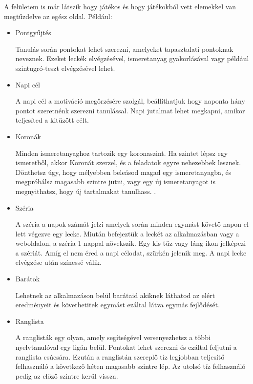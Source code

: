A felületem is már látszik hogy játékos és hogy játékokból vett elemekkel van megtűzdelve az egész oldal. Például:
\begin{itemize}
  \item {Pontgyűjtés}
        \begin{addmargin}[\parindent]{0pt}
          Tanulás során pontokat lehet szerezni, amelyeket tapasztalati pontoknak neveznek. Ezeket leckék elvégzésével, ismeretanyag gyakorlásával vagy például szintugró-teszt elvégzésével lehet.
        \end{addmargin}
  \item Napi cél
        \begin{addmargin}[\parindent]{0pt}
          A napi cél a motiváció megőrzésére szolgál, beállíthatjuk hogy naponta hány pontot szeretnénk szerezni tanulással. Napi jutalmat lehet megkapni, amikor teljesíted a kitűzött célt.
        \end{addmargin}
  \item Koronák
        \begin{addmargin}[\parindent]{0pt}
          Minden ismeretanyaghoz tartozik egy koronaszint. Ha szintet lépsz egy ismeretből, akkor Koronát szerzel, és a feladatok egyre nehezebbek lesznek. Dönthetsz úgy, hogy mélyebben beleásod magad egy ismeretanyagba, és megpróbálsz magasabb szintre jutni, vagy egy új ismeretanyagot is megnyithatsz, hogy új tartalmakat tanulhass. \cite{koronaszintekDuolingo}.
        \end{addmargin}
  \item Széria
        \begin{addmargin}[\parindent]{0pt}
          A széria a napok számát jelzi amelyek során minden egymást követő napon el lett végezve egy lecke. Miután befejeztük a leckét az alkalmazásban vagy a weboldalon, a széria 1 nappal növekszik. Egy kis tűz vagy láng ikon jelképezi a szériát. Amíg el nem éred a napi célodat, szürkén jelenik meg. A napi lecke elvégzése után színessé válik. \cite{szeriaDuolingo}
        \end{addmargin}
  \item Barátok
        \begin{addmargin}[\parindent]{0pt}
          Lehetnek az alkalmazáson belül barátaid akiknek láthatod az elért eredményeit és követhetitek egymást ezáltal látva egymás fejlődését.
        \end{addmargin}
  \item Ranglista
        \begin{addmargin}[\parindent]{0pt}
          A ranglisták egy olyan, amely segítségével versenyezhetsz a többi nyelvtanulóval egy ligán belül. Pontokat lehet szerezni és ezáltal feljutni a ranglista csúcsára. Ezután a ranglistán szereplő tíz legjobban teljesítő felhasználó a következő héten magasabb szintre lép. Az utolsó tíz felhasználó pedig az előző szintre kerül vissza.
        \end{addmargin}
\end{itemize}

